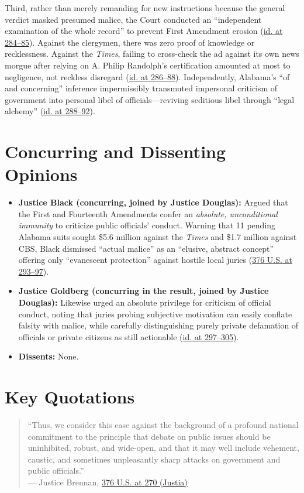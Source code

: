 \documentclass[12pt]{article}
\begin{document}
Third, rather than merely remanding for new instructions because the general verdict masked presumed malice, the Court conducted an ``independent examination of the whole record'' to prevent First Amendment erosion (\href{https://supreme.justia.com/cases/federal/us/376/254/}{id. at 284--85}). Against the clergymen, there was zero proof of knowledge or recklessness. Against the \textit{Times}, failing to cross-check the ad against its own news morgue after relying on A. Philip Randolph's certification amounted at most to negligence, not reckless disregard (\href{https://supreme.justia.com/cases/federal/us/376/254/}{id. at 286--88}). Independently, Alabama's ``of and concerning'' inference impermissibly transmuted impersonal criticism of government into personal libel of officials---reviving seditious libel through ``legal alchemy'' (\href{https://www.law.cornell.edu/supremecourt/text/376/254}{id. at 288--92}).

\section{Concurring and Dissenting Opinions}
\begin{itemize}
  \item \textbf{Justice Black (concurring, joined by Justice Douglas):} Argued that the First and Fourteenth Amendments confer an \textit{absolute, unconditional immunity} to criticize public officials' conduct. Warning that 11 pending Alabama suits sought \$5.6 million against the \textit{Times} and \$1.7 million against CBS, Black dismissed ``actual malice'' as an ``elusive, abstract concept'' offering only ``evanescent protection'' against hostile local juries (\href{https://supreme.justia.com/cases/federal/us/376/254/}{376 U.S. at 293--97}).
  \item \textbf{Justice Goldberg (concurring in the result, joined by Justice Douglas):} Likewise urged an absolute privilege for criticism of official conduct, noting that juries probing subjective motivation can easily conflate falsity with malice, while carefully distinguishing purely private defamation of officials or private citizens as still actionable (\href{https://www.law.cornell.edu/supremecourt/text/376/254}{id. at 297--305}).
  \item \textbf{Dissents:} None.
\end{itemize}

\section{Key Quotations}
\begin{quote}
  ``Thus, we consider this case against the background of a profound national commitment to the principle that debate on public issues should be uninhibited, robust, and wide-open, and that it may well include vehement, caustic, and sometimes unpleasantly sharp attacks on government and public officials.'' \\
  --- Justice Brennan, \href{https://supreme.justia.com/cases/federal/us/376/254/}{376 U.S. at 270 (Justia)}
\end{quote}
\end{document}

